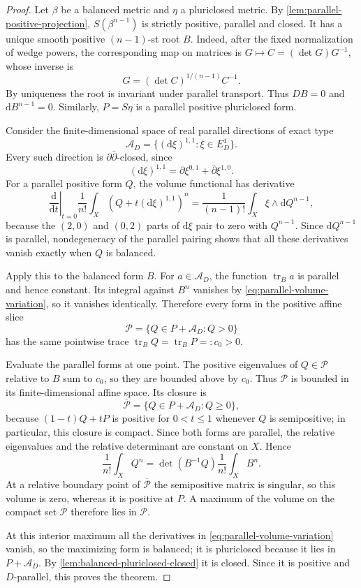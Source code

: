 \begin{proof}
Let $\beta$ be a balanced metric and $\eta$ a pluriclosed metric. By \cref{lem:parallel-positive-projection}, $S(\beta^{n-1})$ is strictly positive, parallel and closed. It has a unique smooth positive $(n-1)$-st root $B$. Indeed, after the fixed normalization of wedge powers, the corresponding map on matrices is $G\mapsto C=(\det G)G^{-1}$, whose inverse is
\[
 G=(\det C)^{1/(n-1)}C^{-1}.
\]
By uniqueness the root is invariant under parallel transport. Thus $DB=0$ and $\mathrm dB^{n-1}=0$. Similarly, $P=S\eta$ is a parallel positive pluriclosed form.

Consider the finite-dimensional space of real parallel directions of exact type
\[
 \mathcal A_D=\{(\mathrm d\xi)^{1,1}:\xi\in E_D^1\}.
\]
Every such direction is $\partial\bar\partial$-closed, since
\[
 (\mathrm d\xi)^{1,1}=\partial\xi^{0,1}+\bar\partial\xi^{1,0}.
\]
For a parallel positive form $Q$, the volume functional has derivative
\begin{equation}\label{eq:parallel-volume-variation}
 \left.\frac{\mathrm d}{\mathrm dt}\right|_{t=0}
       \frac1{n!}\int_X(Q+t(\mathrm d\xi)^{1,1})^n
 =\frac1{(n-1)!}\int_X\xi\wedge\mathrm dQ^{n-1},
\end{equation}
because the $(2,0)$ and $(0,2)$ parts of $\mathrm d\xi$ pair to zero with $Q^{n-1}$. Since $\mathrm dQ^{n-1}$ is parallel, nondegeneracy of the parallel pairing shows that all these derivatives vanish exactly when $Q$ is balanced.

Apply this to the balanced form $B$. For $a\in\mathcal A_D$, the function $\operatorname{tr}_B a$ is parallel and hence constant. Its integral against $B^n$ vanishes by \eqref{eq:parallel-volume-variation}, so it vanishes identically. Therefore every form in the positive affine slice
\[
 \mathcal P=\{Q\in P+\mathcal A_D:Q>0\}
\]
has the same pointwise trace $\operatorname{tr}_B Q=\operatorname{tr}_B P=:c_0>0$.

Evaluate the parallel forms at one point. The positive eigenvalues of $Q\in\mathcal P$ relative to $B$ sum to $c_0$, so they are bounded above by $c_0$. Thus $\mathcal P$ is bounded in its finite-dimensional affine space. Its closure is
\[
 \overline{\mathcal P}=\{Q\in P+\mathcal A_D:Q\geq0\},
\]
because $(1-t)Q+tP$ is positive for $0<t\leq1$ whenever $Q$ is semipositive; in particular, this closure is compact. Since both forms are parallel, the relative eigenvalues and the relative determinant are constant on $X$. Hence
\[
 \frac1{n!}\int_XQ^n
       =\det(B^{-1}Q)\frac1{n!}\int_XB^n.
\]
At a relative boundary point of $\overline{\mathcal P}$ the semipositive matrix is singular, so this volume is zero, whereas it is positive at $P$. A maximum of the volume on the compact set $\overline{\mathcal P}$ therefore lies in $\mathcal P$.

At this interior maximum all the derivatives in \eqref{eq:parallel-volume-variation} vanish, so the maximizing form is balanced; it is pluriclosed because it lies in $P+\mathcal A_D$. By \cref{lem:balanced-pluriclosed-closed} it is closed. Since it is positive and $D$-parallel, this proves the theorem.
\end{proof}
